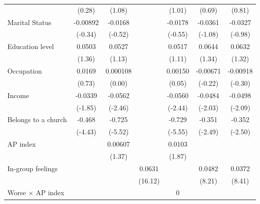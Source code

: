 {\begin{tabular}{l*{6}{c}}
                &   (0.28)         &   (1.08)         &                  &   (1.01)         &   (0.69)         &   (0.81)         \\
Marital Status  & -0.00892         &  -0.0168         &                  &  -0.0178         &  -0.0361         &  -0.0327         \\
                &  (-0.34)         &  (-0.52)         &                  &  (-0.55)         &  (-1.08)         &  (-0.98)         \\
Education level &   0.0503         &   0.0527         &                  &   0.0517         &   0.0644         &   0.0632         \\
                &   (1.36)         &   (1.13)         &                  &   (1.11)         &   (1.34)         &   (1.32)         \\
Occupation      &   0.0169         & 0.000108         &                  &  0.00150         & -0.00671         & -0.00918         \\
                &   (0.73)         &   (0.00)         &                  &   (0.05)         &  (-0.22)         &  (-0.30)         \\
Income          &  -0.0339         &  -0.0562\sym{*}  &                  &  -0.0560\sym{*}  &  -0.0484\sym{*}  &  -0.0498\sym{*}  \\
                &  (-1.85)         &  (-2.46)         &                  &  (-2.44)         &  (-2.03)         &  (-2.09)         \\
Belongs to a church&   -0.468\sym{***}&   -0.725\sym{***}&                  &   -0.729\sym{***}&   -0.351\sym{*}  &   -0.352\sym{*}  \\
                &  (-4.43)         &  (-5.52)         &                  &  (-5.55)         &  (-2.49)         &  (-2.50)         \\
AP index        &                  &  0.00607         &                  &   0.0103         &                  &                  \\
                &                  &   (1.37)         &                  &   (1.87)         &                  &                  \\
In-group feelings&                  &                  &   0.0631\sym{***}&                  &   0.0482\sym{***}&   0.0372\sym{***}\\
                &                  &                  &  (16.12)         &                  &   (8.21)         &   (8.41)         \\
Worse $\times$ AP index&                  &                  &                  &        0         &                  &                  \\

\end{tabular}}
